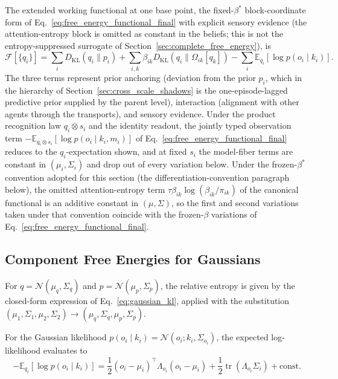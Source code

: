 The extended working functional at one base point, the fixed-$\beta^*$ block-coordinate form of Eq.~\eqref{eq:free_energy_functional_final} with explicit sensory evidence (the attention-entropy block is omitted as constant in the beliefs; this is not the entropy-suppressed surrogate of Section~\ref{sec:complete_free_energy}), is
\begin{equation}
\mathcal{F}[\{q_i\}] = \sum_i D_{\mathrm{KL}}(q_i \| p_i) + \sum_{i,k} \beta_{ik} D_{\mathrm{KL}}(q_i \| \Omega_{ik}[q_k]) - \sum_i \mathbb{E}_{q_i}[\log p(o_i \mid k_i)].
\label{eq:extended_free_energy}
\end{equation}
The three terms represent prior anchoring (deviation from the prior $p_i$, which in the hierarchy of Section~\ref{sec:cross_scale_shadows} is the one-episode-lagged predictive prior supplied by the parent level), interaction (alignment with other agents through the transports), and sensory evidence. Under the product recognition law $q_i \otimes s_i$ and the identity readout, the jointly typed observation term $-\mathbb{E}_{q_i \otimes s_i}[\log p(o_i \mid k_i, m_i)]$ of Eq.~\eqref{eq:free_energy_functional_final} reduces to the $q_i$-expectation shown, and at fixed $s_i$ the model-fiber terms are constant in $(\mu_i, \Sigma_i)$ and drop out of every variation below. Under the frozen-$\beta^*$ convention adopted for this section (the differentiation-convention paragraph below), the omitted attention-entropy term $\tau\beta_{ik}\log(\beta_{ik}/\pi_{ik})$ of the canonical functional is an additive constant in $(\mu, \Sigma)$, so the first and second variations taken under that convention coincide with the frozen-$\beta$ variations of Eq.~\eqref{eq:free_energy_functional_final}.

\subsection{Component Free Energies for Gaussians}

For $q = \mathcal{N}(\mu_q, \Sigma_q)$ and $p = \mathcal{N}(\mu_p, \Sigma_p)$, the relative entropy is given by the closed-form expression of Eq.~\eqref{eq:gaussian_kl}, applied with the substitution $(\mu_1, \Sigma_1, \mu_2, \Sigma_2) \to (\mu_q, \Sigma_q, \mu_p, \Sigma_p)$.

For the Gaussian likelihood $p(o_i \mid k_i) = \mathcal{N}(o_i; k_i, \Sigma_{o_i})$, the expected log-likelihood evaluates to
\begin{equation}
-\mathbb{E}_{q_i}[\log p(o_i \mid k_i)] = \frac{1}{2}(o_i - \mu_i)^\top \Lambda_{o_i}(o_i - \mu_i) + \frac{1}{2}\operatorname{tr}(\Lambda_{o_i}\Sigma_i) + \mathrm{const}.
\end{equation}

